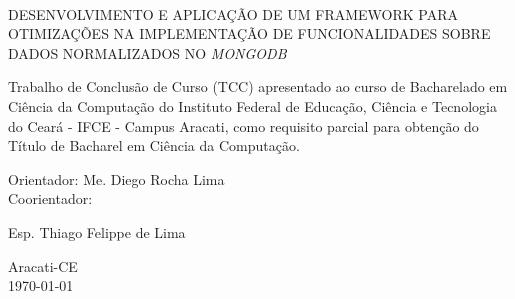 \vfill
\begin{center}

{\imprimirautor\\}
\vspace{3cm}
{\textsc{\uppercase{Desenvolvimento e Aplicação de um Framework para Otimizações na Implementação de Funcionalidades Sobre Dados Normalizados no \textit{MongoDB}}}\\}
\vspace{5cm}
\hspace{.45\linewidth}
\begin{minipage}{.50\linewidth}
Trabalho de Conclusão de Curso (TCC) apresentado ao curso de Bacharelado em Ciência da Computação do Instituto Federal de Educação, Ciência e Tecnologia do Ceará - IFCE - Campus Aracati, como requisito parcial para obtenção do Título de Bacharel em Ciência da Computação.

\vspace{0.5 cm}

Orientador: Me. Diego Rocha Lima\\
Coorientador: \raggedright{Esp. Thiago Felippe de Lima}

\end{minipage}

\vspace{2cm}
\vfill
{\large Aracati-CE\\\today}

\end{center}
